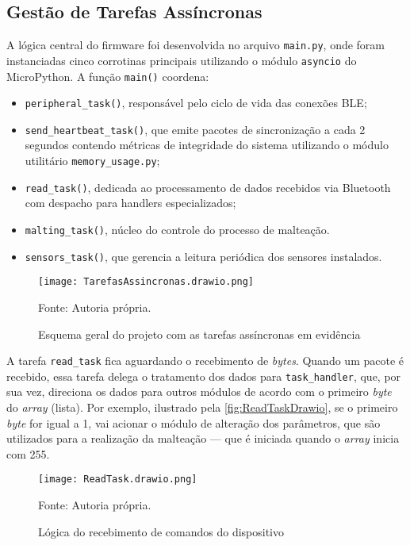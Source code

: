 \subsection{Gestão de Tarefas Assíncronas}
A lógica central do firmware foi desenvolvida no arquivo \texttt{main.py}, onde foram instanciadas cinco corrotinas principais utilizando o módulo \texttt{asyncio} do MicroPython. A função \texttt{main()} coordena:

\begin{itemize}

    \item \texttt{peripheral\_task()}, responsável pelo ciclo de vida das conexões BLE;
    \item \texttt{send\_heartbeat\_task()}, que emite pacotes de sincronização a cada 2 segundos contendo métricas de integridade do sistema utilizando o módulo utilitário \texttt{memory\_usage.py};
    \item \texttt{read\_task()}, dedicada ao processamento de dados recebidos via Bluetooth com despacho para handlers especializados;
    \item \texttt{malting\_task()}, núcleo do controle do processo de malteação.
    \item \texttt{sensors\_task()}, que gerencia a leitura periódica dos sensores instalados.


\end{itemize}

\begin{figure}[ht]
    \centering
    \caption{Esquema geral do projeto com as tarefas assíncronas em evidência}
    \label{fig:TarefasAssincronasFluxograma}
    \texttt{[image: TarefasAssincronas.drawio.png]}

    {\centering\footnotesize Fonte: Autoria própria.\par}
\end{figure}

A tarefa \texttt{read\_task} fica aguardando o recebimento de \textit{bytes}. Quando um pacote é recebido, essa tarefa delega o tratamento dos dados para \texttt{task\_handler}, que, por sua vez, direciona os dados para outros módulos de acordo com o primeiro \textit{byte} do \textit{array} (lista). Por exemplo, ilustrado pela \autoref{fig:ReadTaskDrawio}, se o primeiro \textit{byte} for igual a 1, vai acionar o módulo de alteração dos parâmetros, que são utilizados para a realização da malteação — que é iniciada quando o \textit{array} inicia com 255.

\begin{figure}[ht]
    \centering
    \caption{Lógica do recebimento de comandos do dispositivo}
    \label{fig:ReadTaskDrawio}
    \texttt{[image: ReadTask.drawio.png]}

    {\centering\footnotesize Fonte: Autoria própria.\par}
\end{figure}

